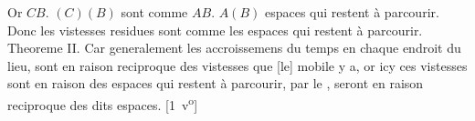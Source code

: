 Or $\displaystyle CB.$ $\displaystyle (C)(B)$ sont comme $\displaystyle AB.$ $\displaystyle A(B)$ espaces qui restent \`{a} parcourir.
Donc les vistesses residues sont comme les espaces qui restent \`{a} parcourir.
\pend
\pstart%
Theoreme II.
\pend
\pstart
\noindent%
\sloppy
{}
\pend
\pstart
\noindent%
Car generalement les accroissemens du temps en chaque endroit du lieu, sont en raison reciproque des vistesses que
[le]
mobile y a,%
or icy ces vistesses sont en raison des espaces qui restent \`{a} parcourir,
par le
,
seront en raison reciproque des dits espaces.
[1~v\textsuperscript{o}]
\pend